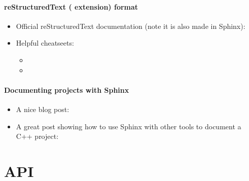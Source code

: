 \documentclass[letterpaper,10pt,english]{sphinxmanual}
\begin{document}
\subsubsection{reStructuredText ( extension) format}
\label{\detokenize{context:restructuredtext-rst-extension-format}}\begin{itemize}
\item {} 
Official reStructuredText documentation (note it is also made in Sphinx):

\item {} 
Helpful cheatseets:
\begin{itemize}
\item {} 

\item {} 

\end{itemize}

\end{itemize}


\subsubsection{Documenting projects with Sphinx}
\label{\detokenize{context:documenting-projects-with-sphinx}}\begin{itemize}
\item {} 
A nice blog post: 

\item {} 
A great post showing how to use Sphinx with other tools to document a C++
project: 

\end{itemize}


\chapter{API}
\label{\detokenize{api_reference:api}}\label{\detokenize{api_reference::doc}}
\end{document}
